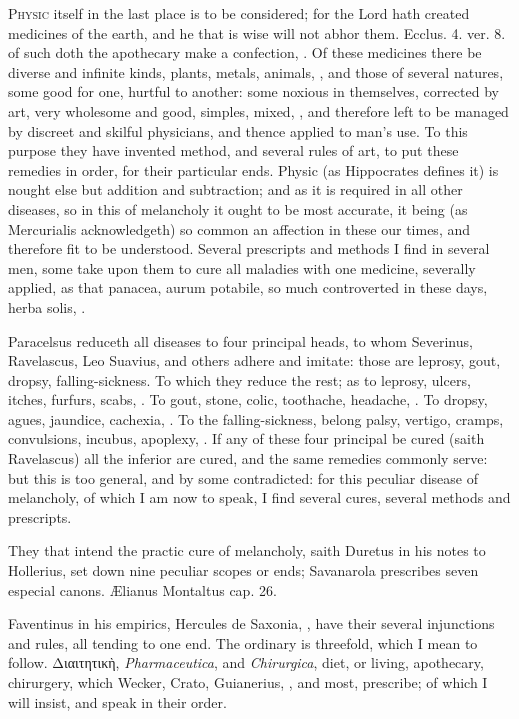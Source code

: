 {\lettrine{P}{hysic} itself in the last place is to be considered; for the Lord hath
created medicines of the earth, and he that is wise will not abhor
them. Ecclus.  4. ver. 8. of such doth the apothecary
make a confection, \etc{}. Of these medicines there be diverse and infinite
kinds, plants, metals, animals, \etc{}, and those of several natures, some
good for one, hurtful to another: some noxious in themselves, corrected
by art, very wholesome and good, simples, mixed, \etc{}, and therefore
left to be managed by discreet and skilful physicians, and thence
applied to man's use. To this purpose they have invented method, and
several rules of art, to put these remedies in order, for their
particular ends. Physic (as Hippocrates defines it) is nought else but
addition and subtraction; and as it is required in all other
diseases, so in this of melancholy it ought to be most accurate, it
being (as Mercurialis acknowledgeth) so common an affection in
these our times, and therefore fit to be understood. Several prescripts
and methods I find in several men, some take upon them to cure all
maladies with one medicine, severally applied, as that panacea, aurum
potabile, so much controverted in these days, herba solis, \etc{}.

Paracelsus reduceth all diseases to four principal heads, to whom
Severinus, Ravelascus, Leo Suavius, and others adhere and imitate:
those are leprosy, gout, dropsy, falling-sickness. To which they reduce
the rest; as to leprosy, ulcers, itches, furfurs, scabs, \etc{}. To gout,
stone, colic, toothache, headache, \etc{}. To dropsy, agues, jaundice,
cachexia, \etc{}. To the falling-sickness, belong palsy, vertigo, cramps,
convulsions, incubus, apoplexy, \etc{}. If any of these four
principal be cured (saith Ravelascus) all the inferior are cured, and
the same remedies commonly serve: but this is too general, and by some
contradicted: for this peculiar disease of melancholy, of which I am
now to speak, I find several cures, several methods and prescripts.

They that intend the practic cure of melancholy, saith Duretus in his
notes to Hollerius, set down nine peculiar scopes or ends; Savanarola
prescribes seven especial canons. \AE{}lianus Montaltus cap. 26.

Faventinus in his empirics, Hercules de Saxonia, \etc{}, have their
several injunctions and rules, all tending to one end. The ordinary is
threefold, which I mean to follow. \textgreek[variant=ancient]{Διαιτητικὴ}, \emph{Pharmaceutica}, and
\emph{Chirurgica}, diet, or living, apothecary, chirurgery, which Wecker,
Crato, Guianerius, \etc{}, and most, prescribe; of which I will insist,
and speak in their order.


}
